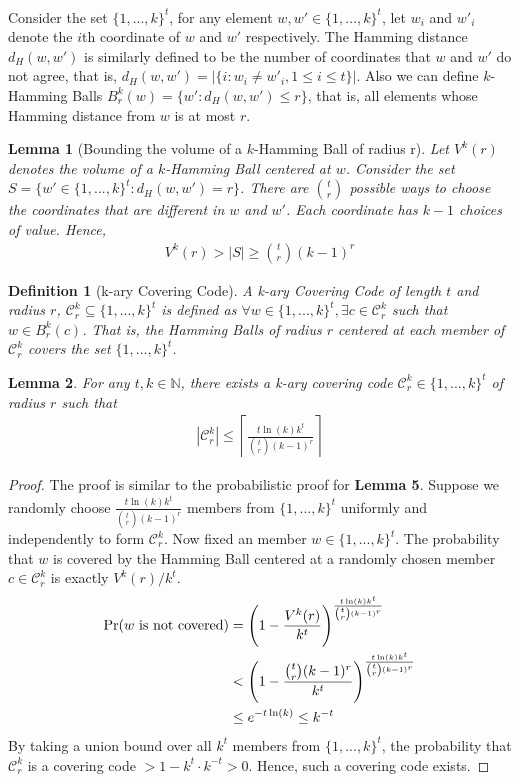 \documentclass[a4paper,12pts]{article}
\newcommand{\dist}[2]{d_H(#1,#2)}
\newcommand{\ballk}[2]{B^k_{#1}(#2)}
\newcommand{\cc}{\mathcal{C}}
\newcommand{\kbits}{\{1,...,k\}}
\renewcommand{\Pr}{\textnormal{Pr}}
\newtheorem{definition}{Definition}
\newtheorem{lemma}{Lemma}
\begin{document}
\paragraph{}Consider the set $\kbits^t$, for any element $w,w' \in \kbits^t$, let $w_i$ and $w'_i$ denote the $i$th coordinate of $w$ and $w'$ respectively. The Hamming distance $\dist{w}{w'}$ is similarly defined to be the number of coordinates that $w$ and $w'$ do not agree, that is, $\dist{w}{w'} = |\{i:w_i \neq w'_i, 1\leq i \leq t \}|$. Also we can define $k$-Hamming Balls $\ballk{r}{w} = \{w':\dist{w}{w'} \leq r\}$, that is, all elements whose Hamming distance from $w$ is at most $r$. 
\begin{lemma}[Bounding the volume of a $k$-Hamming Ball of radius r\cite{Moser11}]
	Let $V^k(r)$ denotes the volume of a $k$-Hamming Ball centered at $w$. Consider the set $S = \{w' \in \kbits^t: \dist{w}{w'} = r\}$. There are ${t \choose r}$ possible ways to choose the coordinates that are different in $w$ and $w'$. Each coordinate has $k-1$ choices of value. Hence,
	\begin{align*}
	V^k(r) > |S| \geq {t \choose r}(k-1)^r
	\end{align*}
\end{lemma}
\begin{definition}[k-ary Covering Code]
	A k-ary Covering Code of length $t$ and radius $r$, $\cc_r^k \subseteq \kbits^t$ is defined as $\forall w \in \kbits^t, \exists c \in \cc_r^k$ such that $w \in \ballk{r}{c}$. That is, the Hamming Balls of radius $r$ centered at each member of $\cc_r^k$ covers the set $\kbits^t$. 
\end{definition}
\begin{lemma}
	For any $t,k \in \mathbb{N}$, there exists a k-ary covering code $\cc^k_r \in \kbits^t$ of radius $r$ such that 
	\begin{align*}
	|\cc^k_r| \leq \left \lceil \frac{t\ln(k)k^t}{{t \choose r}(k-1)^r} \right \rceil
	\end{align*}
\end{lemma}
\begin{proof}
	The proof is similar to the probabilistic proof for \textbf{Lemma 5}. Suppose we randomly choose $\frac{t\ln(k)k^t}{{t \choose r}(k-1)^r}$ members from $\kbits^t$ uniformly and independently to form $\cc^k_r$. Now fixed an member $w \in \kbits^t$. The probability that $w$ is covered by the Hamming Ball centered at a randomly chosen member $c \in \cc^k_r$ is exactly $V^k(r)/k^t$. 
	\begin{align*}
	\Pr(\text{$w$ is not covered}) &= \Bigg(1-\frac{V^k(r)}{k^t}\Bigg)^{\frac{t\ln(k)k^t}{{t \choose r}(k-1)^r}}\\
	&<\Bigg(1-\frac{{t \choose r}(k-1)^r}{k^t}\Bigg)^{\frac{t\ln(k)k^t}{{t \choose r}(k-1)^r}}\\
	&\leq e^{-t\ln(k)} \leq k^{-t}
	\end{align*}
	By taking a union bound over all $k^t$ members from $\kbits^t$, the probability that $\cc^k_r$ is a covering code $> 1 - k^t\cdot k^{-t} > 0$. Hence, such a covering code exists. 
\end{proof}
\end{document}
